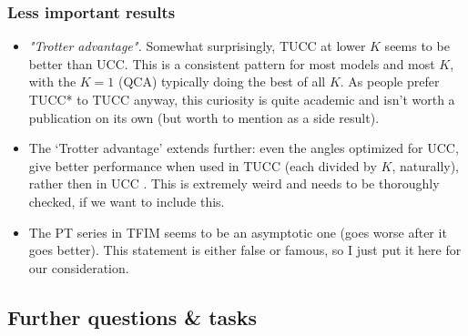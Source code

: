 \documentclass[10pt, a4paper]{article}
\begin{document}
\subsubsection*{Less important results}
\begin{itemize}
\item \textit{"Trotter advantage".} Somewhat surprisingly, TUCC at lower $K$ seems to be better than UCC. This is a consistent pattern for most models and most $K$, with the $K=1$ (QCA) typically doing the best of all $K$. As people prefer TUCC* to TUCC anyway, this curiosity is quite academic and isn't worth a publication on its own (but worth to mention as a side result).

\item The `Trotter advantage' extends further: even the angles optimized for UCC, give better performance when used in TUCC (each divided by $K$, naturally), rather then in UCC . This is extremely weird and needs to be thoroughly checked, if we want to include this.

\item The PT series in TFIM seems to be an asymptotic one (goes worse after it goes better). This statement is either false or famous, so I just put it here for our consideration.
\end{itemize}

\subsection*{Further questions \& tasks}
\end{document}
